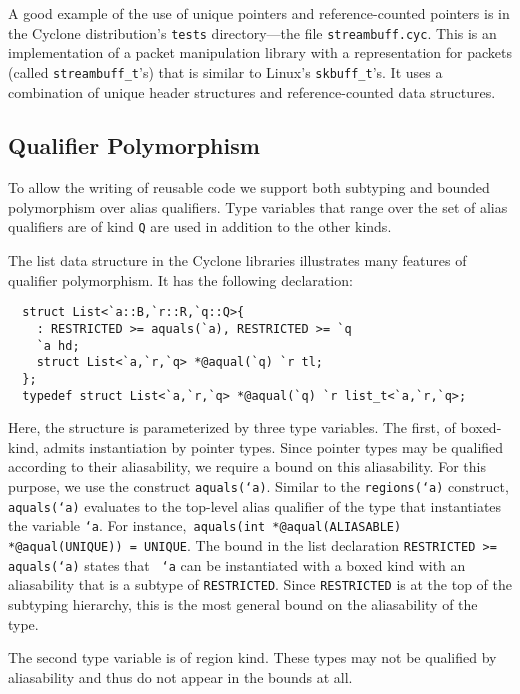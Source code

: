A good example of the use of unique pointers and reference-counted
pointers is in the Cyclone distribution's \texttt{tests}
directory---the file \texttt{streambuff.cyc}.  This is an
implementation of a packet manipulation library with a representation
for packets (called \texttt{streambuff\_t}'s) that is similar to
Linux's \texttt{skbuff\_t}'s.  It uses a combination of unique header
structures and reference-counted data structures.

\subsection{Qualifier Polymorphism}
\label{sec:qual-poly}

To allow the writing of reusable code we support both subtyping and
bounded polymorphism over alias qualifiers. Type variables that range
over the set of alias qualifiers are of kind {\tt Q} are used in
addition to the other kinds. 

The list data structure in the Cyclone libraries illustrates many
features of qualifier polymorphism. It has the following declaration:

\begin{verbatim} 
  struct List<`a::B,`r::R,`q::Q>{ 
    : RESTRICTED >= aquals(`a), RESTRICTED >= `q
    `a hd; 
    struct List<`a,`r,`q> *@aqual(`q) `r tl;
  };
  typedef struct List<`a,`r,`q> *@aqual(`q) `r list_t<`a,`r,`q>;
\end{verbatim}

Here, the structure is parameterized by three type variables. The
first, of boxed-kind, admits instantiation by pointer types. Since
pointer types may be qualified according to their aliasability, we
require a bound on this aliasability. For this purpose, we use the
construct {\tt aquals(`a)}. Similar to the {\tt regions(`a)}
construct, {\tt aquals(`a)} evaluates to the top-level alias qualifier
of the type that instantiates the variable {\tt `a}. For instance,{\tt
aquals(int *@aqual(ALIASABLE) *@aqual(UNIQUE)) = UNIQUE}. The bound in
the list declaration {\tt RESTRICTED >= aquals(`a)} states that {\tt
`a} can be instantiated with a boxed kind with an aliasability that is
a subtype of {\tt RESTRICTED}. Since {\tt RESTRICTED} is at the top of
the subtyping hierarchy, this is the most general bound on the
aliasability of the type.

The second type variable is of region kind. These types may not be
qualified by aliasability and thus do not appear in the bounds at
all. 

